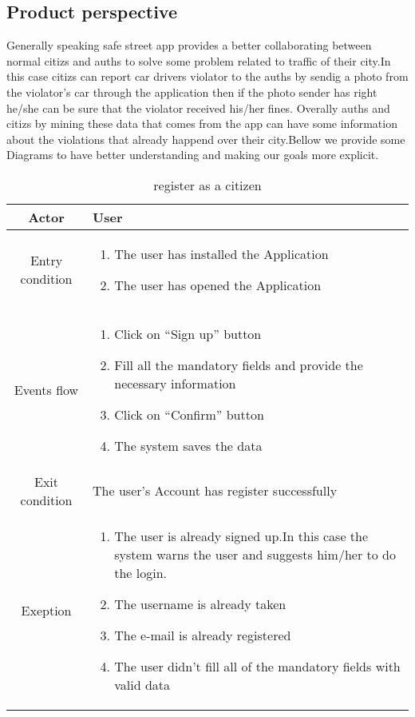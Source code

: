 \documentclass{article}
\begin{document}
	\subsection{Product perspective} Generally speaking safe street app provides a better collaborating between normal citizs and auths to solve some problem related to traffic of their city.In this case citizs can report car drivers violator to the auths by sendig a photo from the violator's car through the application then if the photo sender has right he/she can be sure that the violator received his/her fines. Overally auths and citizs by mining these data that comes from the app can have some information about the violations that already happend over their city.Bellow we provide some Diagrams to have better understanding and making our goals more explicit.

		\begin{table} [H]
		\begin{center}
		\caption{register as a citizen}
		\begin{tabular}{|c|p{8cm}|}
			\hline
			Actor&User\\
			\hline
			Entry condition&
				\begin{enumerate}
					\item The user has installed the Application
					\item The user has opened the Application
				\end{enumerate}\\
			\hline
			Events flow&
			\begin{enumerate}
			\item Click on “Sign up” button
			\item Fill all the mandatory fields and provide the necessary information
			\item Click on “Confirm” button
			\item The system saves the data
			
			\end{enumerate}\\
			\hline
			Exit condition& The user's Account has register successfully\\
			\hline
			Exeption&
			\begin{enumerate}
			\item The user is already signed up.In this case the system warns the user and suggests him/her to do the login.
			\item The username is already taken
			\item The e-mail is already registered
			\item The user didn’t fill all of the mandatory fields with valid data
			
			\end{enumerate}\\
			\hline
		\end{tabular}
				
		\end{center}


		\end{table} 
\end{document}
